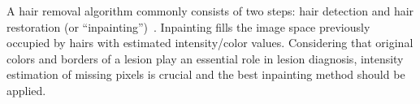A hair removal algorithm commonly consists of two steps: hair detection and hair restoration (or ``inpainting'')~\cite{korotkov2012computerized}.
Inpainting fills the image space previously occupied by hairs with estimated intensity/color values. 
Considering that original colors and borders of a lesion play an essential role in lesion diagnosis, intensity estimation of missing pixels is crucial and the best inpainting method should be applied. 
\begin{figure}
\hspace*{\fill}
\hfill
{}\hfill
{}
\hspace*{\fill}\\

\end{figure}
